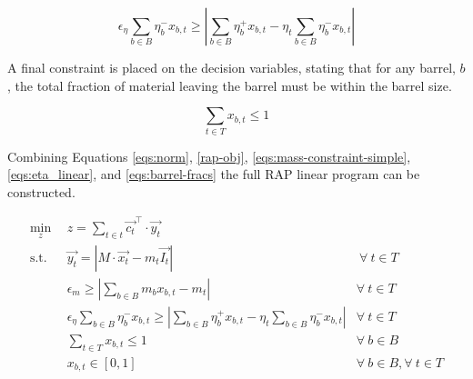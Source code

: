 \begin{equation}
\label{eqs:eta_linear}
\epsilon_{\eta} \sum_{b \in B} \eta_{b}^{-} x_{b,t} \geq
\left| \sum_{b \in B} \eta_{b}^{+} x_{b,t}
- \eta_{t} \sum_{b \in B} \eta_{b}^{-} x_{b,t} \right|
\end{equation}

A final constraint is placed on the decision variables, stating that for any
barrel, $b$, the total fraction of material leaving the barrel must be within
the barrel size.

\begin{equation}
\label{eqs:barrel-fracs}
\sum_{t \in T} x_{b, t} \leq 1
\end{equation}

Combining Equations \ref{eqs:norm}, \ref{rap-obj}, 
\ref{eqs:mass-constraint-simple}, \ref{eqs:eta_linear}, and
\ref{eqs:barrel-fracs} the full RAP linear program can be constructed.

\begin{subequations}\label{eqs:rap}
  \begin{align}
    \min_{z} \:\: & 
    z = \sum_{t \in t} \vec{c_{t}}^{\top} \cdot \vec{y_{t}}
    & \label{eqs:rap_obj} \\
    \text{s.t.} \:\: &
    \vec{y_{t}} = \left| M \cdot \vec{x_{t}}  - m_t \vec{I_{t}} \right|
    &
    \: \forall \: t \in T \label{eqs:rap_iso} \\
    &
    \epsilon_{m} \geq \left| \sum_{b \in B} m_{b} x_{b, t} - m_{t} \right|
    & 
    \forall \: t \in T \label{eqs:rap_mass} \\
    &
    \epsilon_{\eta} \sum_{b \in B} \eta_{b}^{-} x_{b, t} \geq 
    \left| \sum_{b \in B} \eta_{b}^{+} x_{b, t} - 
           \eta_{t} \sum_{b \in B} \eta_{b}^{-} x_{b, t} \right|
    & 
    \forall \: t \in T \label{eqs:rap_eta} \\
    &
    \sum_{t \in T} x_{b, t} \leq 1
    & 
    \forall \: b \in B \label{eqs:rap_conserv} \\
    &
    x_{b, t} \in \left[ 0, 1 \right]
    & 
    \forall \: b \in B, \forall \: t \in T  \label{eqs:rap_x}
  \end{align}
\end{subequations}
